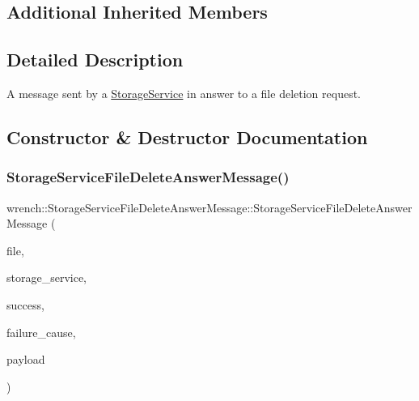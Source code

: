 \subsection*{Additional Inherited Members}


\subsection{Detailed Description}
A message sent by a \hyperlink{classwrench_1_1_storage_service}{Storage\+Service} in answer to a file deletion request. 

\subsection{Constructor \& Destructor Documentation}
\mbox{\label{classwrench_1_1_storage_service_file_delete_answer_message_afe8fdd6488b3027bb80a4e17ead3124d}} 
\subsubsection{\texorpdfstring{Storage\+Service\+File\+Delete\+Answer\+Message()}{StorageServiceFileDeleteAnswerMessage()}}
{\footnotesize\ttfamily wrench\+::\+Storage\+Service\+File\+Delete\+Answer\+Message\+::\+Storage\+Service\+File\+Delete\+Answer\+Message (\begin{DoxyParamCaption}\item[{\hyperlink{classwrench_1_1_workflow_file}{Workflow\+File} $\ast$}]{file,  }\item[{\hyperlink{classwrench_1_1_storage_service}{Storage\+Service} $\ast$}]{storage\+\_\+service,  }\item[{bool}]{success,  }\item[{std\+::shared\+\_\+ptr$<$ \hyperlink{classwrench_1_1_failure_cause}{Failure\+Cause} $>$}]{failure\+\_\+cause,  }\item[{double}]{payload }\end{DoxyParamCaption})}



